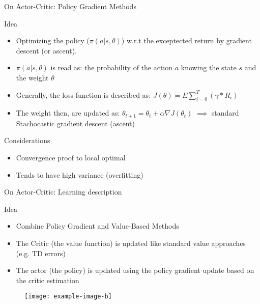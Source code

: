 \documentclass[presentation]{beamer}\mode<presentation>{\usetheme{AMSBolognaFC}}
\begin{document}
\begin{frame}{On Actor-Critic: Policy Gradient Methods}

	\begin{alertblock}{Idea}
		\begin{itemize}
			\item Optimizing the policy ($ \pi(a | s, \theta) $) w.r.t the exceptected return by gradient descent (or ascent).
			\item $\pi(a | s, \theta)$ is read as: the probability of the action $a$ knowing the state $s$ and the weight $\theta$
			\item Generally, the loss function is described as: $J(\theta) = E{\sum_{i = 0}^T}(\gamma * R_i)$
			\item The weight then, are updated as: $ \theta_{t+1} = \theta_t + \alpha \nabla J(\theta_t) $ $\implies$ standard Stachocastic gradient descent (ascent)
		\end{itemize}
	\end{alertblock}

	\begin{exampleblock}{Considerations}
		\begin{itemize}
			\item[{\color{teal} \faThumbsUp}] Convergence proof to local optimal
			\item[{\color{red}} \faThumbsDown] Tends to have high variance (overfitting)
		\end{itemize}
	\end{exampleblock}
\end{frame}

\begin{frame}{On Actor-Critic: Learning description}
	\begin{alertblock}{Idea}
		\begin{itemize}
			\item Combine Policy Gradient and Value-Based Methods
			\item The Critic (the value function) is updated like standard value approaches (e.g. TD errors)
			\item The actor (the policy) is updated using the policy gradient update based on the critic estimation
		\end{itemize}
	\end{alertblock}
	\begin{figure}
		\texttt{[image: example-image-b]}
	\end{figure}
\end{frame}
\end{document}
